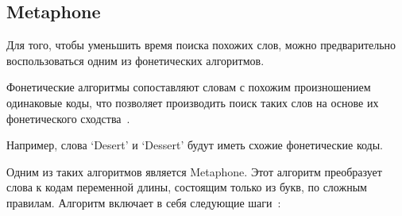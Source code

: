 \subsection{Metaphone}

Для того, чтобы уменьшить время поиска похожих слов, можно предварительно воспользоваться одним из фонетических алгоритмов.

Фонетические алгоритмы сопоставляют словам с похожим произношением одинаковые коды, что позволяет производить поиск таких слов на основе их фонетического сходства~\cite{phonetic}.

Например, слова `Desert' и `Dessert' будут иметь схожие фонетические коды.

Одним из таких алгоритмов является Metaphone. Этот алгоритм преобразует слова к кодам переменной длины, состоящим только из букв, по сложным правилам. Алгоритм включает в себя следующие шаги~\cite{phonetic2}:

